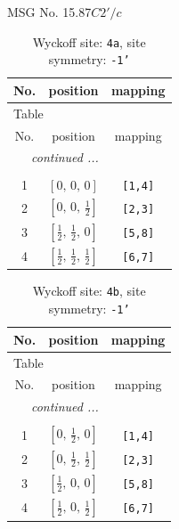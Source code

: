 \documentclass[fleqn,8pt]{jsarticle}
\begin{document}
\setcounter{MaxMatrixCols}{32}

\renewcommand{\tablename}{Table~}
\renewcommand{\figurename}{Figure~}
\begin{center}
\LARGE
MSG No. 15.87\quad$C2'/c$
\end{center}
\renewcommand{\arraystretch}{1.2}
\begin{longtable}{ccc}
\caption{Wyckoff site: {\tt 4a}, site symmetry: {\tt -1'}}
 \\
 \hline \hline
No. & position & mapping \\ \hline \endfirsthead

\multicolumn{2}{l}{\tablename\ \thetable{}} \\
 \hline \hline
No. & position & mapping \\ \hline \endhead

 \hline \hline
\multicolumn{2}{r}{\footnotesize\it continued ...} \\ \endfoot

 \hline \hline
\multicolumn{2}{r}{} \\ \endlastfoot

1 & $\left[ 0,\, 0,\, 0 \right]$ & {\tt [1,4]} \\ \hline
2 & $\left[ 0,\, 0,\, \frac{1}{2} \right]$ & {\tt [2,3]} \\ \hline
3 & $\left[ \frac{1}{2},\, \frac{1}{2},\, 0 \right]$ & {\tt [5,8]} \\ \hline
4 & $\left[ \frac{1}{2},\, \frac{1}{2},\, \frac{1}{2} \right]$ & {\tt [6,7]} \\
\end{longtable}
\renewcommand{\arraystretch}{1.2}
\begin{longtable}{ccc}
\caption{Wyckoff site: {\tt 4b}, site symmetry: {\tt -1'}}
 \\
 \hline \hline
No. & position & mapping \\ \hline \endfirsthead

\multicolumn{2}{l}{\tablename\ \thetable{}} \\
 \hline \hline
No. & position & mapping \\ \hline \endhead

 \hline \hline
\multicolumn{2}{r}{\footnotesize\it continued ...} \\ \endfoot

 \hline \hline
\multicolumn{2}{r}{} \\ \endlastfoot

1 & $\left[ 0,\, \frac{1}{2},\, 0 \right]$ & {\tt [1,4]} \\ \hline
2 & $\left[ 0,\, \frac{1}{2},\, \frac{1}{2} \right]$ & {\tt [2,3]} \\ \hline
3 & $\left[ \frac{1}{2},\, 0,\, 0 \right]$ & {\tt [5,8]} \\ \hline
4 & $\left[ \frac{1}{2},\, 0,\, \frac{1}{2} \right]$ & {\tt [6,7]} \\
\end{longtable}
\end{document}
